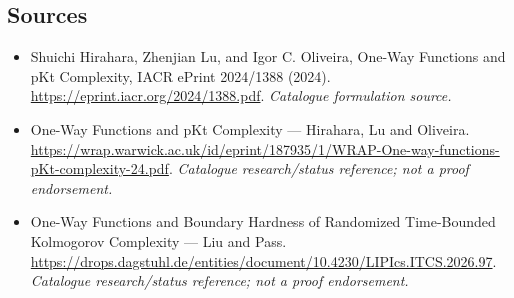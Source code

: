 \documentclass[11pt,a4paper]{article}
\begin{document}
\subsection{Sources}
\begin{itemize}\raggedright
\item[\textnormal{[S1]}]\hypertarget{source:statement:1}{} Shuichi Hirahara, Zhenjian Lu, and Igor C. Oliveira, One-Way Functions and pKt Complexity, IACR ePrint 2024/1388 (2024).
\url{https://eprint.iacr.org/2024/1388.pdf}.
{\small\textit{Catalogue formulation source.}}
\item[\textnormal{[S2]}]\hypertarget{source:statement:2}{} One-Way Functions and pKt Complexity — Hirahara, Lu and Oliveira.
\url{https://wrap.warwick.ac.uk/id/eprint/187935/1/WRAP-One-way-functions-pKt-complexity-24.pdf}.
{\small\textit{Catalogue research/status reference; not a proof endorsement.}}
\item[\textnormal{[S3]}]\hypertarget{source:statement:3}{} One-Way Functions and Boundary Hardness of Randomized Time-Bounded Kolmogorov Complexity — Liu and Pass.
\url{https://drops.dagstuhl.de/entities/document/10.4230/LIPIcs.ITCS.2026.97}.
{\small\textit{Catalogue research/status reference; not a proof endorsement.}}
\end{itemize}

\end{document}
